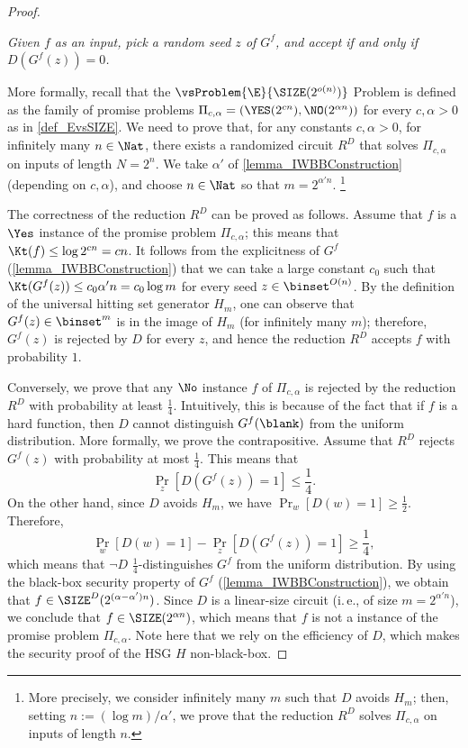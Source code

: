 \documentclass[11pt]{article}
\numberwithin{equation}{section}
\theoremstyle{definition}
\theoremstyle{plain}
\newcommand{\ie}{i.\,e.}
\begin{document}
\begin{proof}
\begin{description}
          \emph{
            Given $f$ as an input,
            pick a random seed $z$ of $G^f$, and accept if and only if $D(G^f(z)) = 0$.
          }
  \end{description}
  More formally,
  recall that the $\vsProblem{\E}{\SIZE(2^{o(n)})}$ Problem is defined as
  the family of promise problems $\Pi_{c, \alpha} = (\YES(2^{c n}), \NO(2^{\alpha n}))$ for every $c, \alpha > 0$
  as in \cref{def_EvsSIZE}.
  We need to prove that, for any constants $c, \alpha > 0$,
  for infinitely many $n \in \Nat$,
  there exists a randomized circuit $R^D$ that solves $\Pi_{c, \alpha}$
  on inputs of length $N = 2^n$.
  We take $\alpha'$ of \cref{lemma_IWBBConstruction} (depending on $c, \alpha$), and
  choose $n \in \Nat$
  so that
  $m = 2^{\alpha' n}$.%
  \footnote{More precisely, we consider infinitely many $m$ such that $D$ avoids $H_m$;
    then, setting $n := (\log m) / \alpha'$, we prove that the reduction $R^D$ solves
    $\Pi_{c, \alpha}$ on inputs of length $n$.}

  The correctness of the reduction $R^D$ can be proved as follows.
  Assume that $f$ is a $\Yes$ instance of the promise problem $\Pi_{c, \alpha}$;
  this means that $\Kt(f) \le \log 2^{c n} = c n$.
  It follows from the explicitness of $G^f$ (\cref{lemma_IWBBConstruction})
  that
  we can take a large constant $c_0$ such that
  $\Kt(G^f(z)) \le c_0 \alpha' n = c_0 \log m$ for every seed $z \in \binset^{O(n)}$.
  By the definition of the universal hitting set generator $H_m$,
  one can observe that $G^f(z) \in \binset^m$ is in the image of $H_m$
  (for infinitely many $m$);
  therefore, $G^f(z)$ is rejected by $D$
  for every $z$,
  and hence the reduction $R^D$ accepts $f$ with probability $1$.

  Conversely,
  we prove that any $\No$ instance $f$ of $\Pi_{c, \alpha}$
  is rejected by the reduction $R^D$ with probability at least $\frac{1}{4}$.
  Intuitively, this is because of the fact that if $f$ is a hard function, then
  $D$ cannot distinguish $G^f(\blank)$
  from the uniform distribution.
  More formally, we prove the contrapositive.
  Assume that $R^D$ rejects $G^f(z)$ with probability at most $\frac{1}{4}$.
  This means that
  $$
    \Pr_z[ D(G^f(z)) = 1 ] \le \frac{1}{4}.
  $$
  On the other hand, since $D$ avoids $H_m$, we have $\Pr_w [ D(w) = 1 ] \ge \frac{1}{2}$.
  Therefore,
  $$
    \Pr_w [D(w) = 1] - \Pr_z[ D(G^f(z)) = 1 ] \ge \frac{1}{4},
  $$
  which means that
  $\neg D$ $\frac{1}{4}$-distinguishes $G^f$ from the uniform distribution.
  By using the black-box security property of $G^f$ (\cref{lemma_IWBBConstruction}),
  we obtain that $f \in \SIZE^D(2^{(\alpha - \alpha') n})$.
  Since $D$ is a linear-size circuit (\ie, of size $m = 2^{\alpha' n}$), we conclude that $f \in \SIZE(2^{\alpha n})$,
  which means that $f$ is not a \No instance of the promise problem $\Pi_{c, \alpha}$.
  Note here that we rely on the efficiency of $D$, which makes the security proof of the HSG $H$ non-black-box.



\end{proof}
\end{document}
